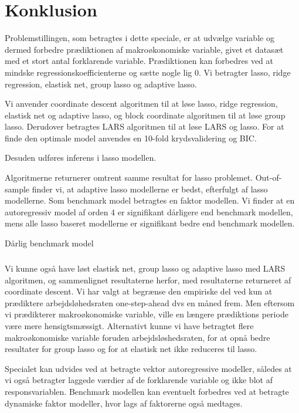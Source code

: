 \chapter{Konklusion}
Problemstillingen, som betragtes i dette speciale, er at udvælge variable og dermed forbedre prædiktionen af makroøkonomiske variable, givet et datasæt med et stort antal forklarende variable.
Prædiktionen kan forbedres ved at mindske regressionskoefficienterne og sætte nogle lig 0.
Vi betragter lasso, ridge regression, elastisk net, group lasso og adaptive lasso.

Vi anvender coordinate descent algoritmen til at løse lasso, ridge regression, elastisk net og adaptive lasso, og block coordinate algoritmen til at løse group lasso.
Derudover betragtes LARS algoritmen til at løse LARS og lasso.
For at finde den optimale model anvendes en 10-fold krydsvalidering og BIC.

Desuden udføres inferens i lasso modellen.





Algoritmerne returnerer omtrent samme resultat for lasso problemet.
Out-of-sample finder vi, at adaptive lasso modellerne er bedst, efterfulgt af lasso modellerne.
Som benchmark model betragtes en faktor modellen.
Vi finder at en autoregressiv model af orden 4 er signifikant dårligere end benchmark modellen, mens alle lasso baseret modellerne er signifikant bedre end benchmark modellen.


Dårlig benchmark model

\paragraph{}
Vi kunne også have løst elastisk net, group lasso og adaptive lasso med LARS algoritmen, og sammenlignet resultaterne herfor, med resultaterne returneret af coordinate descent.
Vi har valgt at begrænse den empiriske del ved kun at prædiktere arbejdsløhedsraten one-step-ahead dvs en måned frem.
Men eftersom vi prædikterer makroøkonomiske variable, ville en længere prædiktions periode være mere hensigtsmæssigt.
Alternativt kunne vi have betragtet flere makroøkonomiske variable foruden arbejdsløshedsraten, for at opnå bedre resultater for group lasso og for at elastisk net ikke reduceres til lasso.

Specialet kan udvides ved at betragte vektor autoregressive modeller, således at vi også betragter laggede værdier af de forklarende variable og ikke blot af responsvariablen.
%
Benchmark modellen kan eventuelt forbedres ved at betragte dynamiske faktor modeller, hvor lags af faktorerne også medtages.